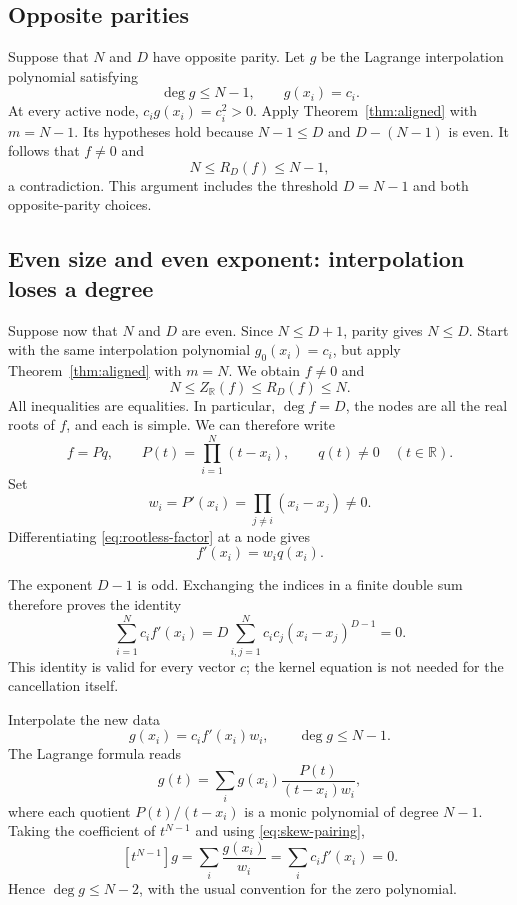 \documentclass[11pt,a4paper]{article}
\numberwithin{equation}{section}
\theoremstyle{remark}
\newcommand{\R}{\mathbb R}
\begin{document}
\subsection{Opposite parities}

Suppose that $N$ and $D$ have opposite parity. Let $g$ be the Lagrange
interpolation polynomial satisfying
\[
 \deg g\le N-1,\qquad g(x_i)=c_i.
\]
At every active node, $c_ig(x_i)=c_i^2>0$. Apply
Theorem~\ref{thm:aligned} with $m=N-1$. Its hypotheses hold because
$N-1\le D$ and $D-(N-1)$ is even. It follows that $f\ne0$ and
\[
 N\le R_D(f)\le N-1,
\]
a contradiction. This argument includes the threshold $D=N-1$ and both
opposite-parity choices.

\subsection{Even size and even exponent: interpolation loses a degree}

Suppose now that $N$ and $D$ are even. Since $N\le D+1$, parity gives
$N\le D$. Start with the same interpolation polynomial $g_0(x_i)=c_i$,
but apply Theorem~\ref{thm:aligned} with $m=N$. We obtain $f\ne0$ and
\[
 N\le Z_\R(f)\le R_D(f)\le N.
\]
All inequalities are equalities. In particular, $\deg f=D$, the nodes are
all the real roots of $f$, and each is simple. We can therefore write
\begin{equation}\label{eq:rootless-factor}
 f=Pq,\qquad P(t)=\prod_{i=1}^{N}(t-x_i),
 \qquad q(t)\ne0\quad(t\in\R).
\end{equation}
Set
\begin{equation}\label{eq:weights}
 w_i=P'(x_i)=\prod_{j\ne i}(x_i-x_j)\ne0.
\end{equation}
Differentiating \eqref{eq:rootless-factor} at a node gives
\begin{equation}\label{eq:derivative-values}
 f'(x_i)=w_iq(x_i).
\end{equation}

The exponent $D-1$ is odd. Exchanging the indices in a finite double sum
therefore proves the identity
\begin{equation}\label{eq:skew-pairing}
 \sum_{i=1}^{N}c_if'(x_i)
 =D\sum_{i,j=1}^{N}c_ic_j(x_i-x_j)^{D-1}=0.
\end{equation}
This identity is valid for every vector $c$; the kernel equation is not
needed for the cancellation itself.

Interpolate the new data
\begin{equation}\label{eq:new-data}
 g(x_i)=c_if'(x_i)w_i,\qquad \deg g\le N-1.
\end{equation}
The Lagrange formula reads
\[
 g(t)=\sum_i g(x_i)\frac{P(t)}{(t-x_i)w_i},
\]
where each quotient $P(t)/(t-x_i)$ is a monic polynomial of degree $N-1$.
Taking the coefficient of $t^{N-1}$ and using \eqref{eq:skew-pairing},
\begin{equation}\label{eq:degree-drop}
 [t^{N-1}]g=\sum_i\frac{g(x_i)}{w_i}
 =\sum_i c_if'(x_i)=0.
\end{equation}
Hence $\deg g\le N-2$, with the usual convention for the zero polynomial.
\end{document}
